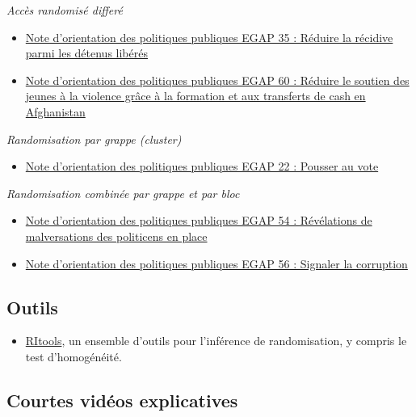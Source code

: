 \documentclass[12pt,]{book}
\providecommand{\tightlist}{%
  \setlength{\itemsep}{0pt}\setlength{\parskip}{0pt}}
\begin{document}
\emph{Accès randomisé differé}

\begin{itemize}
\item
  \href{https://egap.org/resource/brief-35-reducing-reconvictions-among-released-prisoners/}{Note d'orientation des politiques publiques EGAP 35 : Réduire la récidive parmi les détenus libérés}
\item
  \href{https://egap.org/resource/reducing-youth-support-for-violence-through-training-and-cash-transfers-in-afghanistan/}{Note d'orientation des politiques publiques EGAP 60 : Réduire le soutien des jeunes à la violence grâce à la formation et aux transferts de cash en Afghanistan}
\end{itemize}

\emph{Randomisation par grappe (cluster)}

\begin{itemize}
\tightlist
\item
  \href{https://egap.org/resource/brief-22-getting-out-the-vote/}{Note d'orientation des politiques publiques EGAP 22 : Pousser au vote}
\end{itemize}

\emph{Randomisation combinée par grappe et par bloc}

\begin{itemize}
\item
  \href{https://egap.org/resource/evidence-from-mexico-the-effect-of-incumbent-malfeasance-revelations/}{Note d'orientation des politiques publiques EGAP 54 : Révélations de malversations des politicens en place}
\item
  \href{https://egap.org/resource/reporting-corruption-in-nigeria-testing-the-effects-of-norms-nudges/}{Note d'orientation des politiques publiques EGAP 56 : Signaler la corruption}
\end{itemize}

\hypertarget{outils-1}{%
\subsection{Outils}\label{outils-1}}

\begin{itemize}
\tightlist
\item
  \href{https://cran.r-project.org/web/packages/RItools/index.html}{RItools}, un ensemble d'outils pour l'inférence de randomisation, y compris le test d'homogénéité.
\end{itemize}

\hypertarget{courtes-viduxe9os-explicatives}{%
\subsection{Courtes vidéos explicatives}\label{courtes-viduxe9os-explicatives}}
\end{document}
